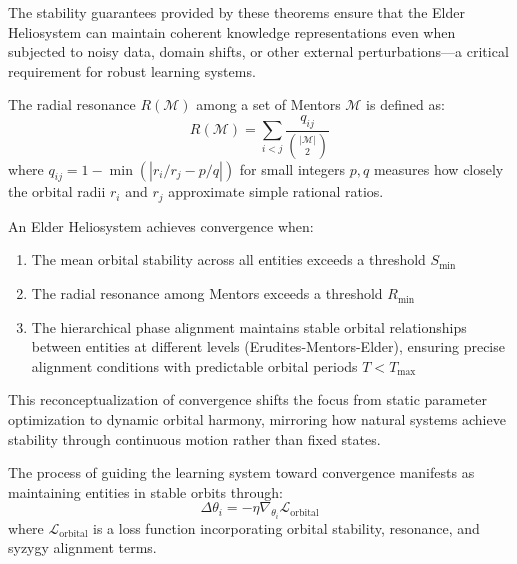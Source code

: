 The stability guarantees provided by these theorems ensure that the Elder Heliosystem can maintain coherent knowledge representations even when subjected to noisy data, domain shifts, or other external perturbations—a critical requirement for robust learning systems.

\begin{definition}
The radial resonance $R(\mathcal{M})$ among a set of Mentors $\mathcal{M}$ is defined as:
\begin{equation}
R(\mathcal{M}) = \sum_{i<j} \frac{q_{ij}}{\binom{|\mathcal{M}|}{2}}
\end{equation}
where $q_{ij} = 1 - \min(|r_i/r_j - p/q|)$ for small integers $p,q$ measures how closely the orbital radii $r_i$ and $r_j$ approximate simple rational ratios.
\end{definition}

\begin{theorem}
An Elder Heliosystem achieves convergence when:
\begin{enumerate}
    \item The mean orbital stability across all entities exceeds a threshold $S_{\text{min}}$
    \item The radial resonance among Mentors exceeds a threshold $R_{\text{min}}$
    \item The hierarchical phase alignment maintains stable orbital relationships between entities at different levels (Erudites-Mentors-Elder), ensuring precise alignment conditions with predictable orbital periods $T < T_{\text{max}}$
\end{enumerate}
\end{theorem}

This reconceptualization of convergence shifts the focus from static parameter optimization to dynamic orbital harmony, mirroring how natural systems achieve stability through continuous motion rather than fixed states.

\begin{proposition}
The process of guiding the learning system toward convergence manifests as maintaining entities in stable orbits through:
\begin{equation}
\Delta\theta_i = -\eta \nabla_{\theta_i} \mathcal{L}_{\text{orbital}}
\end{equation}
where $\mathcal{L}_{\text{orbital}}$ is a loss function incorporating orbital stability, resonance, and syzygy alignment terms.
\end{proposition}

